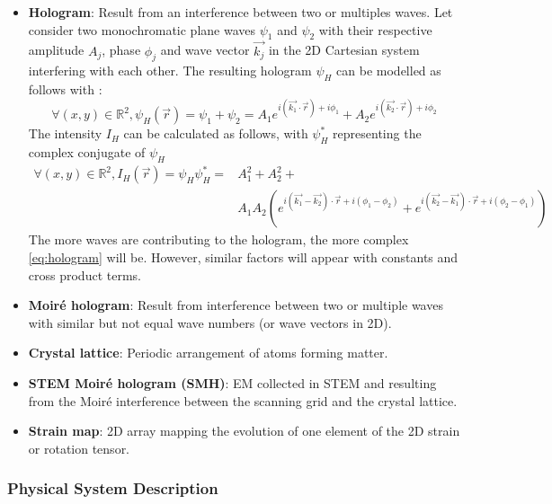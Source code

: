 \documentclass[12pt]{article}
\begin{document}
\begin{itemize}
\begin{figure}[H]
\begin{center}
\label{fig:STEM_imaging_Fig}
\end{center}
\end{figure}
\item \textbf{Hologram}: Result from an interference between two or multiples waves. \newline
Let consider two monochromatic plane waves $\psi_1$ and $\psi_2$ with their respective amplitude $A_j$, phase $\phi_j$ and wave vector $\vec{k_j}$ in the 2D Cartesian system interfering with each other. The resulting hologram $\psi_H$  can be modelled as follows with :
\begin{equation}
\forall (x,y) \in \mathbb{R}^{2}, \psi_H(\vec{r})=\psi_1+\psi_2= A_1e^{i(\vec{k_1}\cdot\vec{r})+i\phi_1}+A_2e^{i(\vec{k_2}\cdot\vec{r})+i\phi_2}
\end{equation}
The intensity $I_H$ can be calculated as follows, with $\psi_H^{*}$ representing the complex conjugate of $\psi_H$
\begin{equation}
\begin{split}
\forall (x,y) \in \mathbb{R}^{2}, I_H(\vec{r})=\psi_H\psi_H^{*}= & A_{1}^{2}+A_{2}^{2}+ \\ & A_{1}A_{2}(e^{i(\vec{k_1}-\vec{k_2})\cdot\vec{r}+i(\phi_1-\phi_2)}+e^{i(\vec{k_2}-\vec{k_1})\cdot\vec{r}+i(\phi_2-\phi_1)})
\end{split}
\label{eq:hologram}
\end{equation}
The more waves are contributing to the hologram, the more complex \cref{eq:hologram} will be. However, similar factors will appear with constants and cross product terms.
\item \textbf{Moir{\'e} hologram}: Result from interference between two or multiple waves with similar but not equal wave numbers (or wave vectors in 2D).
\item \textbf{Crystal lattice}: Periodic arrangement of atoms forming matter.
\item \textbf{STEM Moir{\'e} hologram (SMH)}: EM collected in STEM and resulting from the 
Moir{\'e} interference between the scanning grid and the crystal lattice. 
\item \textbf{Strain map}: 2D array mapping the evolution of one element of the 2D strain or rotation 
tensor. 
\end{itemize}

\subsubsection{Physical System Description}
\end{document}
